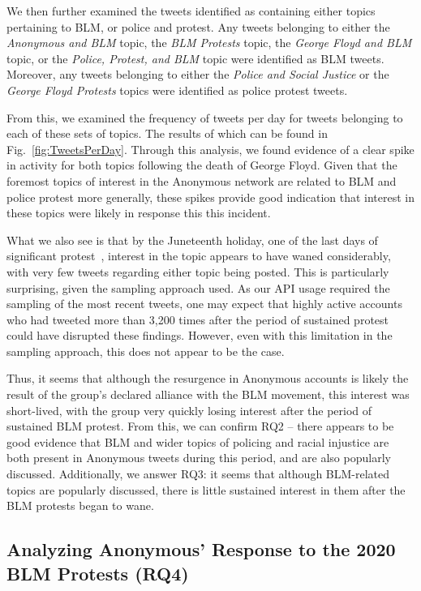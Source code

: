 \documentclass[letterpaper]{article}
\begin{document}
We then further examined the tweets identified as containing either topics pertaining to BLM, or police and protest. Any tweets belonging to either the \textit{Anonymous and BLM} topic, the \textit{BLM Protests} topic, the \textit{George Floyd and BLM} topic, or the \textit{Police, Protest, and BLM} topic were identified as BLM tweets. Moreover, any tweets belonging to either the \textit{Police and Social Justice} or the \textit{George Floyd Protests} topics were identified as police protest tweets.

From this, we examined the frequency of tweets per day for tweets belonging to each of these sets of topics. The results of which can be found in Fig.~\ref{fig:TweetsPerDay}. Through this analysis, we found evidence of a clear spike in activity for both topics following the death of George Floyd. Given that the foremost topics of interest in the Anonymous network are related to BLM and police protest more generally, these spikes provide good indication that interest in these topics were likely in response this this incident.

What we also see is that by the Juneteenth holiday, one of the last days of significant protest~\cite{NYT2020}, interest in the topic appears to have waned considerably, with very few tweets regarding either topic being posted. This is particularly surprising, given the sampling approach used. As our API usage required the sampling of the most recent tweets, one may expect that highly active accounts who had tweeted more than 3,200 times after the period of sustained protest could have disrupted these findings. However, even with this limitation in the sampling approach, this does not appear to be the case.

Thus, it seems that although the resurgence in Anonymous accounts is likely the result of the group's declared alliance with the BLM movement, this interest was short-lived, with the group very quickly losing interest after the period of sustained BLM protest. From this, we can confirm RQ2 -- there appears to be good evidence that BLM and wider topics of policing and racial injustice are both present in Anonymous tweets during this period, and are also popularly discussed. Additionally, we answer RQ3: it seems that although BLM-related topics are popularly discussed, there is little sustained interest in them after the BLM protests began to wane.

\subsection{Analyzing Anonymous' Response to the 2020 BLM Protests (RQ4)}
\end{document}
